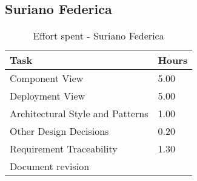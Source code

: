 \subsection{Suriano Federica}
\renewcommand{\arraystretch}{2}
\begin{longtable}{|m{9cm}|m{1.2cm}|}
\caption{Effort spent - Suriano Federica}\\
\hline
\endfirsthead
\endhead
\hline
\endlastfoot
\rowcolor{green2}
\textbf{Task} &\hfil {\textbf{Hours}}\\
\hline
Component View & \hfil 5.00 \\
Deployment View & \hfil 5.00\\
Architectural Style and Patterns & \hfil 1.00\\
Other Design Decisions & \hfil 0.20\\
Requirement Traceability  & \hfil 1.30\\
Document revision & \hfil \\
\hline
\end{longtable}
